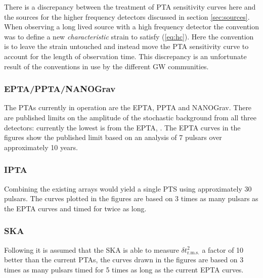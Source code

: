There is a discrepancy between the treatment of PTA sensitivity curves here and the sources for the higher frequency detectors discussed in section \ref{sec:sources}. When observing a long lived source with a high frequency detector the convention was to define a new \emph{characteristic} strain to satisfy (\ref{eq:hc}). Here the convention is to leave the strain untouched and instead move the PTA sensitivity curve to account for the length of observation time. This discrepancy is an unfortunate result of the conventions in use by the different GW communities.


\subsubsection{EPTA/PPTA/NANOGrav}
The PTAs currently in operation are the EPTA, PPTA and NANOGrav. There are published limits on the amplitude of the stochastic background from all three detectors: currently the lowest is from the EPTA, \cite{Haasteren}. The EPTA curves in the figures show the  published limit based on an analysis of 7 pulsars over approximately 10 years.

\subsubsection{IPTA}
Combining the existing arrays would yield a single PTS using approximately 30 pulsars. The curves plotted in the figures are based on 3 times as many pulsars as the EPTA curves and timed for twice as long.

\subsubsection{SKA}
Following \cite{SesanaVecchioColancino} it is assumed that the SKA is able to measure $\delta t^{2}_{\textrm{r.m.s.}}$ a factor of 10 better than the current PTAs, the curves drawn in the figures are based on 3 times as many pulsars timed for 5 times as long as the current EPTA curves.





